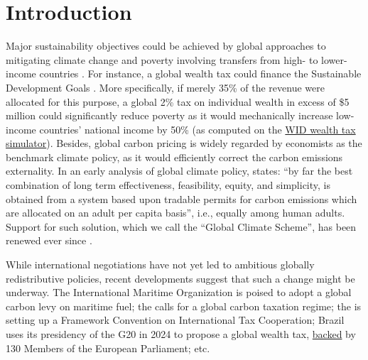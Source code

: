 \section{Introduction}%
Major sustainability objectives could be achieved by global approaches to mitigating climate change and poverty involving transfers from high- to lower-income countries \citep{budolfson_climate_2021,franks_mobilizing_2018,dennig_inequality_2015,soergel_combining_2021,bauer_quantification_2020,cramton_global_2017}. For instance, a global wealth tax could finance the Sustainable Development Goals \citep{piketty_brief_2022}. More specifically, if merely 35\% of the revenue were allocated for this purpose, a global 2\% tax on individual wealth in excess of \$5 million could significantly reduce poverty as it would mechanically increase low-income countries' national income by 50\% (as computed on the \href{https://wid.world/world-wealth-tax-simulator/}{WID wealth tax simulator}). Besides, global carbon pricing is widely regarded by economists as the benchmark climate policy, as it would efficiently correct the carbon emissions externality. In an early analysis of global climate policy, \citet{grubb_greenhouse_1990} states: ``by far the best combination of long term effectiveness, feasibility, equity, and simplicity, is obtained from a system based upon tradable permits for carbon emissions which are allocated on an adult per capita basis'', i.e., equally among human adults. Support for such solution, which we call the ``Global Climate Scheme'', has been renewed ever since \citep{hoel_carbon_1991,agarwal_global_1991,bertram_tradeable_1992,baer_equity_2000,jamieson_climate_2001,blanchard_major_2021,rajan_global_2021}. 

While international negotiations have not yet led to ambitious globally redistributive policies, recent developments suggest that such a change might be underway. The International Maritime Organization is poised to adopt a global carbon levy on maritime fuel; the \citet{african_union_african_2023} calls for a global carbon taxation regime; the \citet{un_promotion_2023} is setting up a Framework Convention on International Tax Cooperation; Brazil uses its presidency of the G20 in 2024 to propose a global wealth tax, %
\href{https://www.lemonde.fr/idees/article/2023/03/14/taxation-mondiale-sur-les-ultrariches-ce-que-nous-avons-reussi-pour-les-multinationales-nous-devons-le-faire-pour-les-grandes-fortunes_6165354_3232.html}{backed} by 130 Members of the European Parliament; etc. 

